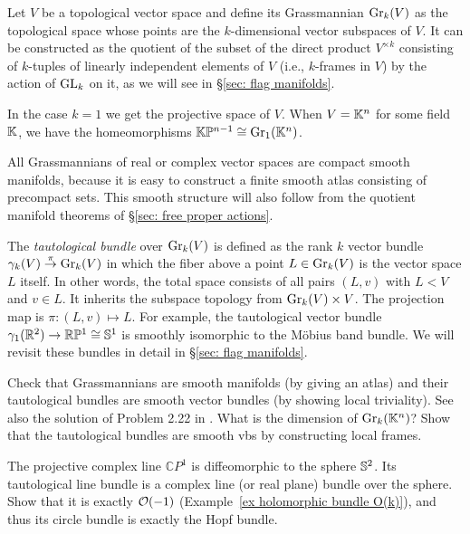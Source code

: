 \begin{example}
    Let $V$ be a topological vector space and define its Grassmannian $\operatorname{Gr}_k(V)$ as the topological space whose points are the $k$-dimensional vector subspaces of $V$. It can be constructed as the quotient of the subset of the direct product $V^{\times k}$ consisting of $k$-tuples of linearly independent elements of $V$ (i.e., $k$-frames in $V$) by the action of $\operatorname{GL}_k$ on it, as we will see in \S\ref{sec: flag manifolds}.
    
    In the case $k=1$ we get the projective space of $V$. When $V=\mathbb{K}^n$ for some field $\mathbb{K}$, we have the homeomorphisms $\mathbb{K}\mathbb{P}^{n-1}\cong \operatorname{Gr}_1(\mathbb{K}^n)$.
    
    All Grassmannians of real or complex vector spaces are compact smooth manifolds, because it is easy to construct a finite smooth atlas consisting of precompact sets. This smooth structure will also follow from the quotient manifold theorems of \S\ref{sec: free proper actions}.
    
    The \emph{tautological bundle} over $\operatorname{Gr}_k(V)$ is defined as the rank $k$ vector bundle $\gamma_{k}(V)\overset\pi\to \operatorname{Gr}_k(V)$ in which the fiber above a point $L\in \operatorname{Gr}_k(V)$ is the vector space $L$ itself. In other words, the total space consists of all pairs $(L,v)$ with $L<V$ and $v\in L$. It inherits the subspace topology from $\operatorname{Gr}_k(V)\times V$. The projection map is $\pi:(L,v)\mapsto L$.  For example, the tautological vector bundle $\gamma_1(\mathbb{R}^2)\to \mathbb{R}\mathbb{P}^1\cong \mathbb{S}^1$ is smoothly isomorphic to the M\"obius band bundle. We will revisit these bundles in detail in \S\ref{sec: flag manifolds}.
\end{example}

\begin{xca}
    Check that Grassmannians are smooth manifolds (by giving an atlas) and their tautological bundles are smooth vector bundles (by showing local triviality). See also the solution of Problem 2.22 in \cite{Gadea}. What is the dimension of $\operatorname{Gr}_k(\mathbb{K}^n)$? Show that the tautological bundles are smooth \glspl{vb} by constructing local frames.
\end{xca}

\begin{xca}\label{xca hopf complex line bundle}
    The projective complex line $\mathbb{C}P^1$ is diffeomorphic to the sphere $\mathbb{S}^2$. Its tautological line bundle is a complex line (or real plane) bundle over the sphere. Show that it is exactly $\mathcal{O}(-1)$ (Example~\ref{ex holomorphic bundle O(k)}), and thus its circle bundle is exactly the Hopf bundle.
\end{xca}









